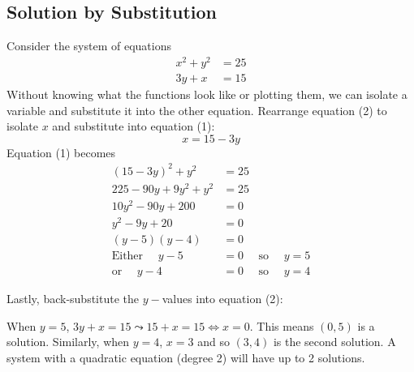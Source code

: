 \subsection*{Solution by Substitution}
 \example Consider the system of equations
 \begin{align}x^{2} +y^{2} &  = 25 \tag{1} \\
 3 y +x &  = 15 \tag{2}\end{align}
 \solution Without knowing what the functions look like or plotting them, we can isolate a variable and substitute it into the other equation. Rearrange equation (2) to isolate $x$ and substitute into equation (1):
$$x =  15 -3 y $$
 Equation (1) becomes
 \begin{align*}(15-3y)^2+y^2 &  =  25 \tag{expand and simplify}\\
 225-90y+9y^2+y^2&=25\\
 10 y^{2} -90 y +200 &  =  0 \tag{divide by 10}\\
 y^{2} -9 y +20 &  = 0 \tag{factor the quadratic}\\
 \left (y -5\right ) \left (y -4\right ) &  =  0 \\
 \text{Either }\quad y -5 &  =  0\quad\text{ so }\quad y =5 \\
 \text{or }\quad y -4 &  =  0\quad\text{ so }\quad y =4\end{align*}

Lastly, back-substitute the $y-$values into equation (2):

 When $y =5$, $3 y +x =15 \leadsto 15 +x =15 \Longleftrightarrow x =0$. This means $\left (0 ,5\right )$ is a solution. Similarly, when $y =4$, $x =3$ and so $(3 ,4)$ is the second solution. A system with a quadratic equation (degree 2) will have up to 2 solutions.

